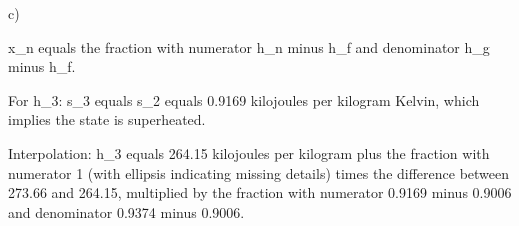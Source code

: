 c)

x_n equals the fraction with numerator h_n minus h_f and denominator h_g minus h_f.

For h_3:
s_3 equals s_2 equals 0.9169 kilojoules per kilogram Kelvin, which implies the state is superheated.

Interpolation:
h_3 equals 264.15 kilojoules per kilogram plus the fraction with numerator 1 (with ellipsis indicating missing details) times the difference between 273.66 and 264.15, multiplied by the fraction with numerator 0.9169 minus 0.9006 and denominator 0.9374 minus 0.9006.